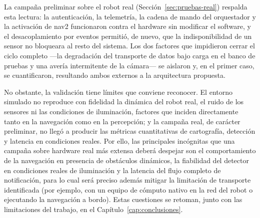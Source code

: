 La campaña preliminar sobre el robot real (Sección~\ref{sec:pruebas-real}) respalda esta
lectura: la autenticación, la telemetría, la cadena de mando del orquestador y la activación
de \gls{nav2} funcionaron contra el hardware sin modificar el software, y el desacoplamiento
por eventos permitió, de nuevo, que la indisponibilidad de un sensor no bloqueara al resto del
sistema. Los dos factores que impidieron cerrar el ciclo completo —la degradación del
transporte de datos bajo carga en el banco de pruebas y una avería intermitente de la cámara—
se aislaron y, en el primer caso, se cuantificaron, resultando ambos externos a la arquitectura
propuesta.

No obstante, la validación tiene límites que conviene reconocer. El entorno
simulado no reproduce con fidelidad la dinámica del robot real, el ruido de los sensores ni
las condiciones de iluminación, factores que inciden directamente tanto en la navegación
como en la percepción; y la campaña real, de carácter preliminar, no llegó a producir las
métricas cuantitativas de cartografía, detección y latencia en condiciones reales. Por ello,
las principales incógnitas que una campaña sobre hardware real más extensa deberá despejar
son el comportamiento de la navegación en presencia de obstáculos dinámicos, la fiabilidad del
detector en condiciones reales de iluminación y la latencia del flujo completo de
notificación, para lo cual será preciso además mitigar la limitación de transporte
identificada (por ejemplo, con un equipo de cómputo nativo en la red del robot o ejecutando la
navegación a bordo). Estas cuestiones se retoman, junto con las limitaciones del
trabajo, en el Capítulo~\ref{cap:conclusiones}.
